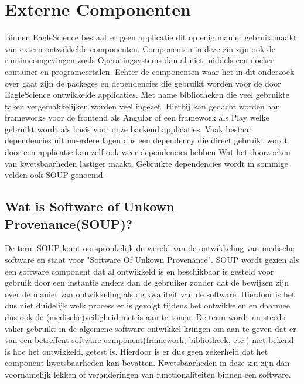 \section{Externe Componenten}\label{sec:software-of-unkown-provenance}
Binnen EagleScience bestaat er geen applicatie dit op enig manier gebruik maakt van extern ontwikkelde componenten. Componenten in deze zin zijn ook de runtime\-omgevingen zoals Operatingsystems dan al niet middels een docker container en programeertalen. Echter de componenten waar het in dit onderzoek over gaat zijn de packeges en dependencies die gebruikt worden voor de door EagleScience ontwikkelde applicaties. Met name bibliotheken die veel gebruikte taken vergemakkelijken worden veel ingezet. Hierbij kan gedacht worden aan frameworks voor de frontend als Angular of een framework als Play welke gebruikt wordt als basis voor onze backend applicaties. Vaak bestaan dependencies uit meerdere lagen dus een dependency die direct gebruikt wordt door een applicatie kan zelf ook weer dependencies hebben Wat het doorzoeken van kwetsbaarheden lastiger maakt. Gebruikte dependencies wordt in sommige velden ook SOUP genoemd.

\subsection{Wat is Software of Unkown Provenance(SOUP)?}\label{subsec:wat-is-soup?2}
De term SOUP komt oorspronkelijk de wereld van de ontwikkeling van medische software en staat voor "Software Of Unkown Provenance".
SOUP wordt gezien als een software component dat al ontwikkeld is en beschikbaar is gesteld voor gebruik door een instantie anders dan de gebruiker zonder dat de bewijzen zijn over de manier van ontwikkeling als de kwaliteit van de software.
Hierdoor is het dus niet duidelijk welk process er is gevolgt tijdens het ontwikkelen en daarmee dus ook de (medische)veiligheid niet is aan te tonen.
De term wordt nu steeds vaker gebruikt in de algemene software ontwikkel kringen om aan te geven dat er van een betreffent software component(framework, bibliotheek, etc.) niet bekend is hoe het ontwikkeld, getest is.
Hierdoor is er dus geen zekerheid dat het component kwetsbaarheden kan bevatten.
Kwetsbaarheden in deze zin zijn dan voornamelijk lekken of veranderingen van functionaliteiten binnen een software.

